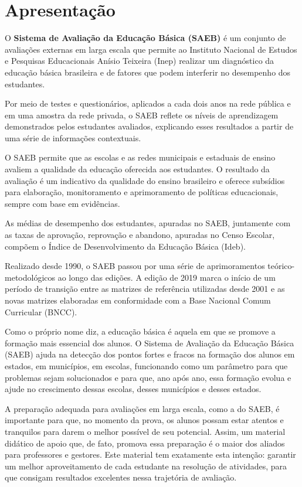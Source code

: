 
\chapter{Apresentação}

O \textbf{Sistema de Avaliação da Educação Básica (SAEB)} é um conjunto
de avaliações externas em larga escala que permite ao Instituto Nacional
de Estudos e Pesquisas Educacionais Anísio Teixeira (Inep) realizar um
diagnóstico da educação básica brasileira e de fatores que podem
interferir no desempenho dos estudantes.

Por meio de testes e questionários, aplicados a cada dois anos na rede
pública e em uma amostra da rede privada, o SAEB reflete os níveis de
aprendizagem demonstrados pelos estudantes avaliados, explicando esses
resultados a partir de uma série de informações contextuais.

O SAEB permite que as escolas e as redes municipais e estaduais de
ensino avaliem a qualidade da educação oferecida aos estudantes. O
resultado da avaliação é um indicativo da qualidade do ensino brasileiro
e oferece subsídios para elaboração, monitoramento e aprimoramento de
políticas educacionais, sempre com base em evidências.

As médias de desempenho dos estudantes, apuradas no SAEB, juntamente com
as taxas de aprovação, reprovação e abandono, apuradas no Censo Escolar,
compõem o Índice de Desenvolvimento da Educação Básica (Ideb).

Realizado desde 1990, o SAEB passou por uma série de aprimoramentos
teórico-metodológicos ao longo das edições. A edição de 2019 marca o
início de um período de transição entre as matrizes de referência
utilizadas desde 2001 e as novas matrizes elaboradas em conformidade com
a Base Nacional Comum Curricular (BNCC).


Como o próprio nome diz, a educação básica é aquela em que se promove a
formação mais essencial dos alunos. O Sistema de Avaliação da Educação
Básica (SAEB) ajuda na detecção dos pontos fortes e fracos na formação
dos alunos em estados, em municípios, em escolas, funcionando como um
parâmetro para que problemas sejam solucionados e para que, ano após
ano, essa formação evolua e ajude no crescimento dessas escolas, desses
municípios e desses estados.

A preparação adequada para avaliações em larga escala, como a do SAEB, é
importante para que, no momento da prova, os alunos possam estar atentos
e tranquilos para darem o melhor possível de seu potencial. Assim, um
material didático de apoio que, de fato, promova essa preparação é o
maior dos aliados para professores e gestores. Este material tem
exatamente esta intenção: garantir um melhor aproveitamento de cada
estudante na resolução de atividades, para que consigam resultados
excelentes nessa trajetória de avaliação.

